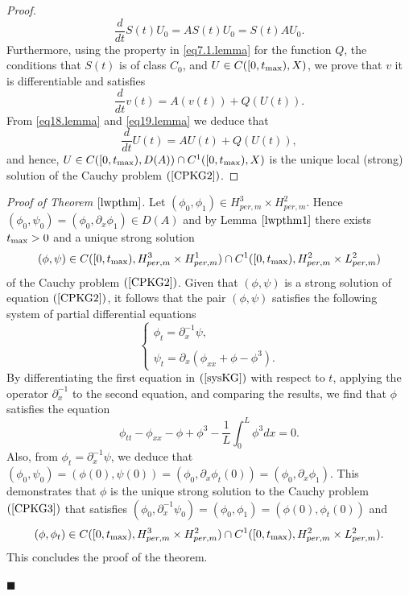 \documentclass[12pt,reqno,a4paper]{amsart} %
\numberwithin{equation}{section}
\numberwithin{figure}{section}
\begin{document}
\begin{proof}
\begin{equation}\label{eq18.lemma}  
	\frac{d}{dt}S(t) U_0=AS(t)U_0=S(t)AU_0.
\end{equation}
Furthermore, using the property in \eqref{eq7.1.lemma} for the function $Q$, the conditions that $S(t)$ is of class $C_0$, and $ U\in C([0,t_{\rm{max}}),X)$, we prove that $v$ it is differentiable and satisfies
\begin{equation}\label{eq19.lemma}  
		\frac{d}{dt}v(t)=A(v(t))+Q(U(t)).
\end{equation}
From \eqref{eq18.lemma} and \eqref{eq19.lemma} we deduce that \begin{equation}\label{eq20.lemma}  
 	\frac{d}{dt}U(t)= AU(t)+Q(U(t)) ,
\end{equation} and hence, $ U\in C([0,t_{\rm{max}}),D(A))\cap C^1([0,t_{\rm{max}}),X)$ is the unique local (strong) solution of the Cauchy problem $(\ref{CPKG2})$. 
\end{proof}


\noindent \textit{Proof of Theorem $\ref{lwpthm}$.} Let $(\phi_0,\phi_1)\in H_{per,m}^3\times H_{per,m}^2$. Hence $(\phi_0,\psi_0)=(\phi_0,\partial_x \phi_1)\in D(A)$ and by Lemma $\ref{lwpthm1}$ there exists $t_{\rm{max}}>0$ and a unique strong solution\noindent $$(\phi,\psi)\in C([0,t_{\rm{max}}),H_{per,m}^3\times H_{per,m}^1)\cap C^1([0,t_{\rm{max}}),H_{per,m}^2\times L_{per,m}^2)$$ of the Cauchy problem 
$(\ref{CPKG2})$. Given that $(\phi,\psi)$ is a strong solution of equation $(\ref{CPKG2})$, it follows that the pair $(\phi,\psi)$ satisfies the following system of partial differential equations
\begin{equation}\label{sysKG}
\left\{\begin{array}{llll}\phi_t=\partial_x^{-1}\psi,\\\\
\psi_t=\partial_x(\phi_{xx}+\phi-\phi^3).
\end{array}\right.
\end{equation}
\indent By differentiating the first equation in $(\ref{sysKG})$ with respect to $t$, applying the operator $\partial_x^{-1}$ to the second equation, and comparing the results, we find that $\phi$ satisfies the equation 
\begin{equation}\label{zmphi4}
\phi_{tt}-\phi_{xx}-\phi+\phi^3-\frac{1}{L}\int_0^L\phi^3dx=0.
\end{equation}
Also, from $\phi_t=\partial_x^{-1}\psi$, we deduce that  $(\phi_0,\psi_0)=(\phi(0),\psi(0))=(\phi_0,\partial_x\phi_t(0))=(\phi_0,\partial_x\phi_1)$. This demonstrates that $\phi$ is the unique strong solution to the Cauchy problem $(\ref{CPKG3})$ that satisfies $(\phi_0,\partial_x^{-1}\psi_0)=(\phi_0,\phi_1)=(\phi(0),\phi_t(0))$ and $$(\phi,\phi_t)\in C([0,t_{\rm{max}}),H_{per,m}^3\times H_{per,m}^2)\cap C^1([0,t_{\rm{max}}),H_{per,m}^2\times L_{per,m}^2).$$  This concludes the proof of the theorem. 
\begin{flushright}
$\blacksquare$
\end{flushright}
 
\end{document}
